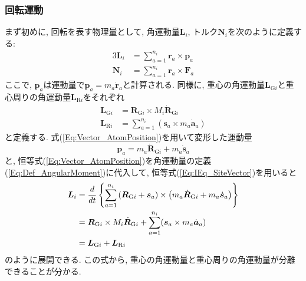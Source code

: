 \subsubsection{回転運動}
まず初めに, 回転を表す物理量として, 角運動量$\bm{L}_{i}$, トルク$\bm{N}_{i}$を次のように定義する:
\begin{alignat}{3}
  \bm{L}_{i} &= \sum_{a=1}^{n_{i}} \bm{r}_{a} \times \bm{p}_{a}
  \label{Eq:Def_AngularMoment}
  \\
  \bm{N}_{i} &= \sum_{a=1}^{n_{i}} \bm{r}_{a} \times \bm{F}_{a}
  \label{Eq:Def_Torque}
\end{alignat}
ここで, $\bm{p}_{a}$は運動量で$\bm{p}_{a} = m_{a} \dot{\bm{r}}_{a}$と計算される.
同様に, 重心の角運動量$\bm{L}_{\mathrm{G}i}$と重心周りの角運動量$\bm{L}_{\mathrm{R}i}$をそれぞれ
\begin{align}
  \bm{L}_{\mathrm{G}i} &= \bm{R}_{\mathrm{G}i} \times M_{i} \dot{\bm{R}}_{\mathrm{G}i}
  \\
  \bm{L}_{\mathrm{R}i} &= \sum_{a=1}^{n_{i}} (\bm{s}_{a} \times m_{a} \dot{\bm{a}}_{a})
\end{align}
と定義する.
式(\ref{Eq:Vector_AtomPosition})を用いて変形した運動量
\begin{equation}
  \bm{p}_{a}
  =
  m_{a} \dot{\bm{R}}_{\mathrm{G}i} + m_{a}\dot{\bm{s}}_{a}
  \label{Eq:Momentum_Rg_s}
\end{equation}
と, 恒等式(\ref{Eq:Vector_AtomPosition})を角運動量の定義(\ref{Eq:Def_AngularMoment})に代入して, 恒等式(\ref{Eq:IEq_SiteVector})を用いると
\begin{align}
  \bm{L}_{i}
  &=
  \frac{d}{dt}
  \left\{
    \sum_{a=1}^{n_{i}}
    \left(\bm{R}_{\mathrm{G}i} + \bm{s}_{a}\right)
    \times
    \left(m_{a} \dot{\bm{R}}_{\mathrm{G}i} + m_{a}\dot{\bm{s}}_{a}\right)
  \right\}
  \notag \\
  &=
  \bm{R}_{\mathrm{G}i} \times M_{i} \dot{\bm{R}}_{\mathrm{G}i}
  +
  \sum_{a=1}^{n_{i}} (\bm{s}_{a} \times m_{a} \dot{\bm{a}}_{a})
  \notag \\
  &=
  \bm{L}_{\mathrm{G}i} + \bm{L}_{\mathrm{R}i}
\end{align}
のように展開できる.
この式から, 重心の角運動量と重心周りの角運動量が分離できることが分かる.

